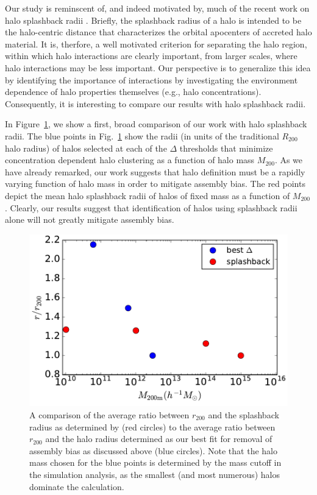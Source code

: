 \documentclass[usenatbib,fleqn]{mnras}
\begin{document}
Our study is reminscent of, and indeed motivated by, much of the recent work on halo splashback radii \citep{more_etal15}.  Briefly, the splashback radius of a halo is intended to be the halo-centric distance that characterizes the orbital apocenters of accreted halo material. It is, therfore, a well motivated criterion for separating the halo region, within which halo interactions are clearly important, from larger scales, where halo interactions may be less important. Our perspective is to generalize this idea by identifying the importance of interactions by investigating the environment dependence of halo properties themselves (e.g., halo concentrations). Consequently, it is interesting to compare our results with halo splashback radii. 

In Figure~\ref{fig:splashback_compare}, we show a first, broad comparison of our work with halo splashback radii. The blue points in Fig.~\ref{fig:splashback_compare} show the radii (in units of the traditional $R_{200}$ halo radius) of halos selected at each of the $\Delta$ thresholds that minimize concentration dependent halo clustering as a function of halo mass $M_{200}$. As we have already remarked, our work suggests that halo definition must be a rapidly varying function of halo mass in order to mitigate assembly bias. The red points depict the mean halo splashback radii of halos of fixed mass as a function of $M_{200}$ \citep[from][]{more_etal15}. Clearly, our results suggest that identification of halos using splashback radii alone will not greatly mitigate assembly bias. 

\begin{figure}
	\centering
	\includegraphics[width=.4\textwidth]{test_splashback.pdf}
	\caption{A comparison of the average ratio between $r_{200}$ and the splashback radius as determined by
	 \citet{more_etal15} (red circles) to the average ratio between $r_{200}$ and the halo radius determined as our
	  best fit for removal of assembly bias as discussed above (blue circles). Note that the halo mass chosen for
	  the blue points is determined by the mass cutoff in the simulation analysis, as the smallest (and most
	  numerous) halos dominate the calculation.}
	\label{fig:splashback_compare}
\end{figure}
\end{document}
